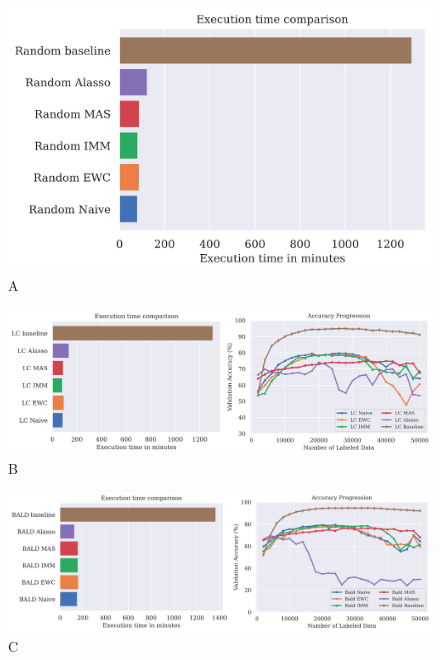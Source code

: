 \begin{figure} [ht]
    \centering
    \includegraphics[width=\linewidth]{images/results_CAL/Random_CAL_2000b.png}
    \caption[Continual Active Learning Random 2000 batch size]{A}
    \label{fig:Evaluation:Results:CAL:Random2000}
\end{figure}

\begin{figure} [ht]
    \centering
    \includegraphics[width=\linewidth]{images/results_CAL/LC_CAL_2000b.png}
    \caption[Continual Active Learning Random 2000 batch size]{B}
    \label{fig:Evaluation:Results:CAL:LC2000}
\end{figure}

\begin{figure} [ht]
    \centering
    \includegraphics[width=\linewidth]{images/results_CAL/Bald_CAL_2000b.png}
    \caption[Continual Active Learning BALD 2000 batch size]{C}
    \label{fig:Evaluation:Results:CAL:BALD2000}
\end{figure}

